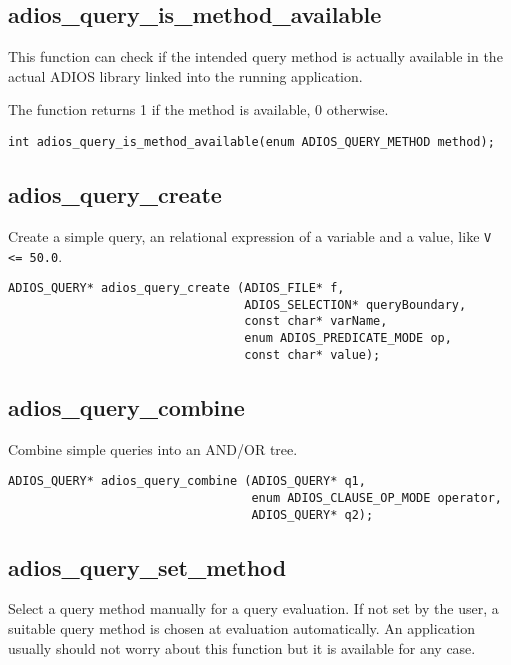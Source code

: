 \subsection{adios\_query\_is\_method\_available}
This function can check if the intended query method is actually available in the actual ADIOS library linked into the running application. 

\noindent The function returns 1 if the method is available, 0 otherwise.

\begin{lstlisting}[alsolanguage=C]
int adios_query_is_method_available(enum ADIOS_QUERY_METHOD method);
\end{lstlisting}

\subsection{adios\_query\_create}
Create a simple query, an relational expression of a variable and a value, like \verb+V <= 50.0+. 

\begin{lstlisting}[alsolanguage=C]
ADIOS_QUERY* adios_query_create (ADIOS_FILE* f,
                                 ADIOS_SELECTION* queryBoundary,
                                 const char* varName,
                                 enum ADIOS_PREDICATE_MODE op,
                                 const char* value);
\end{lstlisting}

\subsection{adios\_query\_combine}
Combine simple queries into an AND/OR tree. 

\begin{lstlisting}[alsolanguage=C]
ADIOS_QUERY* adios_query_combine (ADIOS_QUERY* q1,
                                  enum ADIOS_CLAUSE_OP_MODE operator,
                                  ADIOS_QUERY* q2);
\end{lstlisting}

\subsection{adios\_query\_set\_method}
Select a query method manually for a query evaluation. If not set by the user, a suitable query method is chosen at evaluation automatically. An application usually should not worry about this function but it is available for any case. 

